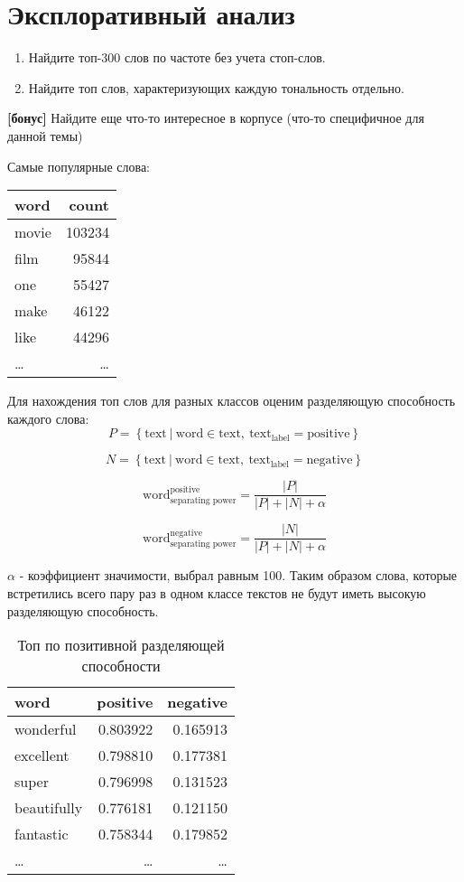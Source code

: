 \documentclass[12pt]{article}
\newcommand{\condition}[1]
{
\begin{tcolorbox}[enhanced jigsaw,
    sharp corners,
    boxrule=0.5pt, 
    colback=white!30!white,   
    borderline={0.5pt}{-2pt}{black,solid} %
]
#1
\end{tcolorbox}
}
\begin{document}
\section{Эксплоративный анализ}
\condition{
\begin{enumerate}
    \item Найдите топ-300 слов по частоте без учета стоп-слов.
    \item Найдите топ слов, характеризующих каждую тональность отдельно.
\end{enumerate}
\textbf{[бонус]} Найдите еще что-то интересное в корпусе (что-то специфичное для данной темы)
}
\vspace{5mm}

Самые популярные слова: \\

\begin{tabular}{lr}
\hline
word & count \\
\hline
movie & 103234 \\
film & 95844 \\
one & 55427 \\
make & 46122 \\
like & 44296 \\
\dots & \dots \\
\hline
\end{tabular}
\vspace{5mm}

Для нахождения топ слов для разных классов оценим разделяющую способность каждого слова:
$$ P = \left \{ \text{text} \ | \ \text{word} \in \text{text}, \ \text{text}_\text{label} = \text{positive} \right \} $$

$$ N = \left \{ \text{text} \ | \ \text{word} \in \text{text}, \ \text{text}_\text{label} = \text{negative} \right \} $$

$$ \text{word}^{\text{positive}}_{\text{separating power}} = \frac{|P|}{|P| + |N| + \alpha} $$

$$ \text{word}^{\text{negative}}_{\text{separating power}} = \frac{|N|}{|P| + |N| + \alpha} $$

$\alpha$ - коэффициент значимости, выбрал равным 100. Таким образом слова, которые встретились всего пару раз в одном классе текстов не будут иметь высокую разделяющую способность.

\begin{table}[h]
\centering
\begin{tabular}{lrr}
\hline
word & positive & negative \\
\hline
wonderful & 0.803922 & 0.165913 \\
excellent & 0.798810 & 0.177381 \\
super & 0.796998 & 0.131523 \\
beautifully & 0.776181 & 0.121150 \\
fantastic & 0.758344 & 0.179852 \\
\dots & \dots & \dots \\
\hline
\end{tabular}
\caption{Топ по позитивной разделяющей способности}
\end{table}
\end{document}
